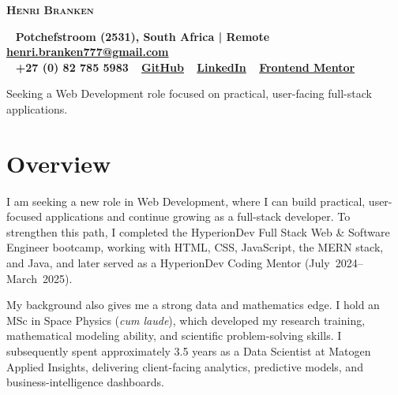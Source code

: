 \documentclass[a4paper,10pt]{article}
\begin{document}
\begin{center}
	{\Huge\textbf{\textsc{\textcolor{burnt}{Henri Branken}}}}\\[0.5cm]
\end{center}

\begin{tcolorbox}[
	colback=teal!10, %
	colframe=teal,   %
	boxrule=1pt, %
	width=\textwidth,
	left=10pt, right=10pt, %
	sharp corners=northwest
	]
	\begin{center}
		\faHome~ \textbf{Potchefstroom (2531), South Africa | Remote} \quad \faEnvelope~ \href{mailto:henri.branken777@gmail.com}{\textbf{henri.branken777@gmail.com}} \quad\\
		\faPhone~ \textbf{+27 (0) 82 785 5983} \quad \faGithub~ \href{https://github.com/HenriBranken}{\textbf{GitHub}} \quad \faLinkedin~ \href{https://www.linkedin.com/in/henri-branken-1423a2153/}{\textbf{LinkedIn}} \quad \faLaptopCode~ \href{https://www.frontendmentor.io/profile/HenriBranken}{\textbf{Frontend Mentor}}
	\end{center}
\end{tcolorbox}

\begin{tcolorbox}[
	colback=burntshade,
	colframe=burnt,
	boxrule=1pt,
	sharp corners=northwest,
	rounded corners=southwest,
	coltitle=white,
	fonttitle=\large\bfseries\scshape,
	title=Open to Work,
	width=\textwidth,
	left=10pt, right=10pt, top=5pt, bottom=5pt
	]
	Seeking a Web Development role focused on practical, user-facing full-stack applications.
\end{tcolorbox}

\section*{Overview}
I am seeking a new role in Web Development, where I can build practical, user-focused applications and continue growing as a full-stack developer. To strengthen this path, I completed the HyperionDev Full Stack Web \& Software Engineer bootcamp, working with HTML, CSS, JavaScript, the MERN stack, and Java, and later served as a HyperionDev Coding Mentor (July~2024--March~2025).

My background also gives me a strong data and mathematics edge. I hold an MSc in Space Physics (\textit{cum laude}), which developed my research training, mathematical modeling ability, and scientific problem-solving skills. I subsequently spent approximately 3.5 years as a Data Scientist at Matogen Applied Insights, delivering client-facing analytics, predictive models, and business-intelligence dashboards.
\end{document}
